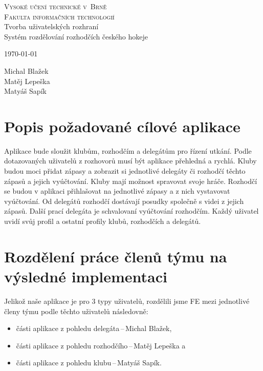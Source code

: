 \documentclass[a4paper, 11pt]{article}
\begin{document}
\begin{titlepage}
\begin{center}
    \Huge
    \textsc{Vysoké učení technické v~Brně\\
    \huge{Fakulta informačních technologií}}\\
    \LARGE{Tvorba uživatelských rozhraní}\\
    \Huge{Systém rozdělování rozhodčích českého hokeje}\\
\end{center}
{\Large \today \hfill \parbox{5cm}{\raggedleft Michal Blažek\\Matěj Lepeška\\Matyáš Sapík}}
\end{titlepage}

\section{Popis požadované cílové aplikace}

Aplikace bude sloužit klubům, rozhodčím a delegátům pro řízení utkání. Podle
dotazovaných uživatelů z rozhovorů musí být aplikace přehledná a rychlá. Kluby budou
moci přidat zápasy a zobrazit si jednotlivé delegáty či rozhodčí těchto zápasů a jejich
vyúčtování. Kluby mají možnost spravovat svoje hráče. Rozhodčí se budou v aplikaci
přihlašovat na jednotlivé zápasy a z nich vystavovat vyúčtování. Od delegátů rozhodčí
dostávají posudky společně s videi z jejich zápasů. Další prací delegáta je schvalovaní
vyúčtování rozhodčím. Každý uživatel uvidí svůj profil a ostatní profily klubů, rozhodčích a
delegátů.

\section{Rozdělení práce členů týmu na výsledné implementaci}

Jelikož naše aplikace je pro 3 typy uživatelů, rozdělili jsme FE mezi jednotlivé členy týmu
podle těchto uživatelů následovně:
\begin{itemize}
    \item části aplikace z pohledu delegáta\,--\,Michal Blažek,
    \item části aplikace z pohledu rozhodčího\,--\,Matěj Lepeška a
    \item části aplikace z pohledu klubu\,--\,Matyáš Sapík.
\end{itemize}
\end{document}

